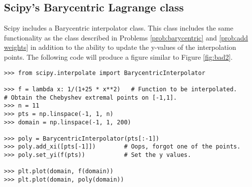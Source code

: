 \subsection*{Scipy's Barycentric Lagrange class}
Scipy includes a Barycentric interpolator class.
This class includes the same functionality as the class described in Problems \ref{prob:barycentric} and \ref{prob:add weights} in addition to the ability to update the y-values of the interpolation points.
The following code will produce a figure similar to Figure \ref{fig:bad2}.
\begin{lstlisting}
>>> from scipy.interpolate import BarycentricInterpolator

>>> f = lambda x: 1/(1+25 * x**2)   # Function to be interpolated.
# Obtain the Chebyshev extremal points on [-1,1].
>>> n = 11
>>> pts = np.linspace(-1, 1, n)
>>> domain = np.linspace(-1, 1, 200)

>>> poly = BarycentricInterpolator(pts[:-1])
>>> poly.add_xi([pts[-1]])        # Oops, forgot one of the points.
>>> poly.set_yi(f(pts))           # Set the y values.

>>> plt.plot(domain, f(domain))
>>> plt.plot(domain, poly(domain))
\end{lstlisting}

\begin{comment} # Potential timing problem comparing student written barycentr, lagrange and Scipy's Lagrange.  Superceded by later problem which also includes Chebyshev.
\begin{problem}
Compare the runtime and error of your Lagrange and Barycentric methods with Scipy's Barycentric class by writing two functions, one comparing error and the other run-time.
Both functions should accept a callable function to interpolate and an integer designating how many interpolating points should be used.
All computations should be made on 200 equally spaced points on the interval $[-1, 1]$ with the interpolating points coming from the Chebyshev roots.
Both functions should print the runtime or error of the interpolation for all three methods with an accompanying description (so that it is obvious which time/error corresponds to which method).
When calculating error, use \li{np.linalg.norm()} with \li{ord=np.inf}.
\end{problem}
\end{comment}

